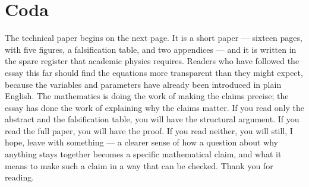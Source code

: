 \documentclass[12pt]{article}
\begin{document}
\section*{Coda}

The technical paper begins on the next page. It is a short paper --- sixteen pages, with five figures, a falsification table, and two appendices --- and it is written in the spare register that academic physics requires. Readers who have followed the essay this far should find the equations more transparent than they might expect, because the variables and parameters have already been introduced in plain English. The mathematics is doing the work of making the claims precise; the essay has done the work of explaining why the claims matter. If you read only the abstract and the falsification table, you will have the structural argument. If you read the full paper, you will have the proof. If you read neither, you will still, I hope, leave with something --- a clearer sense of how a question about why anything stays together becomes a specific mathematical claim, and what it means to make such a claim in a way that can be checked. Thank you for reading.
\end{document}
